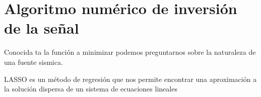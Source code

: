 \chapter{Algoritmo numérico de inversión de la señal}

Conocida ta la función a minimizar podemos preguntarnos sobre la naturaleza de
una fuente sismica.

LASSO es un método de regresión que nos permite encontrar una aproximación a la
solución dispersa de un sistema de ecuaciones lineales \cite{tibshirani1996regression}


